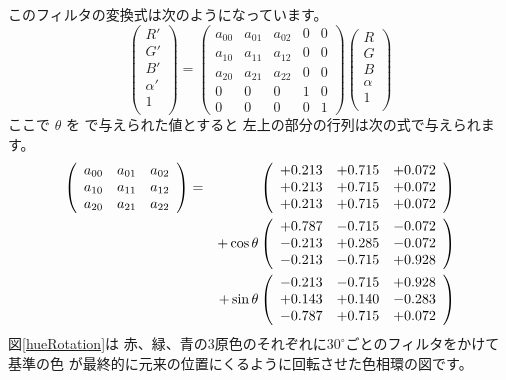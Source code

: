 このフィルタの変換式は次のようになっています。
\[
 \left(\begin{array}{c}
  R'\\G'\\B'\\\alpha'\\1\\
       \end{array}\right)=
\left(\begin{array}{ccccc}
  a_{00} &a_{01}& a_{02} & 0 & 0 \\
  a_{10} &a_{11}& a_{12} & 0 & 0 \\
  a_{20} &a_{21}& a_{22} & 0 & 0 \\
  0      & 0    & 0      & 1 & 0 \\
  0      & 0    & 0      & 0 & 1
      \end{array}\right)
 \left(\begin{array}{c}
  R\\G\\B\\\alpha\\1\\
       \end{array}\right)
\]
ここで $\theta$ を で与えられた値とすると
左上の部分の行列は次の式で与えられます。
\begin{eqnarray*}
\left(\begin{array}{ccc}
  a_{00} &a_{01}& a_{02}  \\
  a_{10} &a_{11}& a_{12}  \\
  a_{20} &a_{21}& a_{22} 
      \end{array}\right)&=&\hphantom{+\cos\theta}
\left(\begin{array}{ccc}
  +0.213& +0.715& +0.072\\
  +0.213& +0.715& +0.072\\
  +0.213& +0.715& +0.072
      \end{array}\right)\\&&+
 \cos\theta
\left(\begin{array}{ccc}
  +0.787 &-0.715 &-0.072\\
  -0.213 &+0.285 &-0.072\\
  -0.213 &-0.715 &+0.928
      \end{array}\right)\\&&+
\sin\theta
\left(\begin{array}{ccc}
  -0.213 &-0.715 &+0.928\\
  +0.143 &+0.140 &-0.283\\
  -0.787 &+0.715 &+0.072
      \end{array}\right)
\end{eqnarray*}
図\ref{hueRotation}は
赤、緑、青の3原色のそれぞれに$30^{\circ}$ごとのフィルタをかけて基準の色
が最終的に元来の位置にくるように回転させた色相環の図です。

